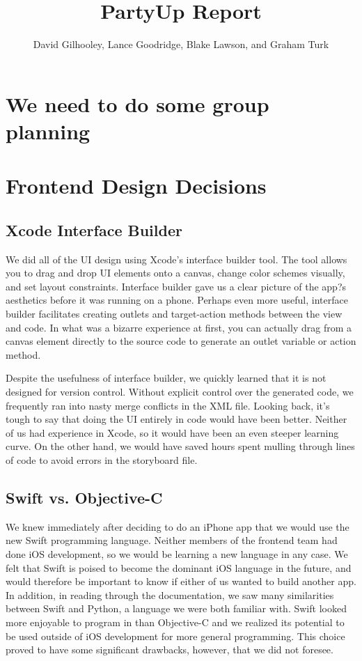 \documentclass[12pt]{article}
\title{PartyUp Report}
\author{David Gilhooley, Lance Goodridge, Blake Lawson, and Graham Turk}
\begin{document}
\pagestyle{plain}

\maketitle

\section{We need to do some group planning}

\section{Frontend Design Decisions}

\subsection{Xcode Interface Builder}

We did all of the UI design using Xcode's interface builder tool. The tool allows you to drag and drop UI elements onto a canvas, change color schemes visually, and set layout constraints. Interface builder gave us a clear picture of the app?s aesthetics before it was running on a phone. Perhaps even more useful, interface builder facilitates creating outlets and target-action methods between the view and code. In what was a bizarre experience at first, you can actually drag from a canvas element directly to the source code to generate an outlet variable or action method. 

\bigskip

Despite the usefulness of interface builder, we quickly learned that it is not designed for version control. Without explicit control over the generated code, we frequently ran into nasty merge conflicts in the XML file. Looking back, it's tough to say that doing the UI entirely in code would have been better. Neither of us had experience in Xcode, so it would have been an even steeper learning curve. On the other hand, we would have saved hours spent mulling through lines of code to avoid errors in the storyboard file. 

\bigskip

\subsection{Swift vs. Objective-C}
We knew immediately after deciding to do an iPhone app that we would use the new Swift programming language. Neither members of the frontend team had done iOS development, so we would be learning a new language in any case. We felt that Swift is poised to become the dominant iOS language in the future, and would therefore be important to know if either of us wanted to build another app. In addition, in reading through the documentation, we saw many similarities between Swift and Python, a language we were both familiar with. Swift looked more enjoyable to program in than Objective-C and we realized its potential to be used outside of iOS development for more general programming. This choice proved to have some significant drawbacks, however, that we did not foresee. 
\end{document}
